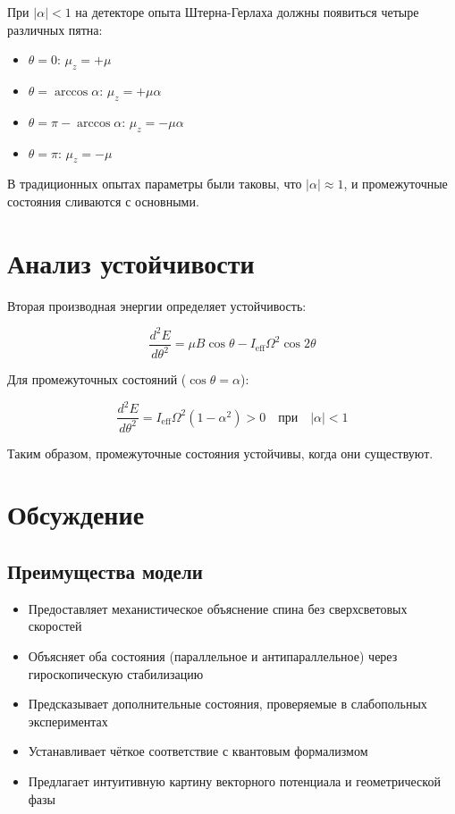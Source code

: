 \documentclass[12pt]{article}
\begin{document}
При $|\alpha| < 1$ на детекторе опыта Штерна-Герлаха должны появиться четыре различных пятна:

\begin{itemize}
\item $\theta = 0$: $\mu_z = +\mu$
\item $\theta = \arccos\alpha$: $\mu_z = +\mu\alpha$
\item $\theta = \pi - \arccos\alpha$: $\mu_z = -\mu\alpha$
\item $\theta = \pi$: $\mu_z = -\mu$
\end{itemize}

В традиционных опытах параметры были таковы, что $|\alpha| \approx 1$, и промежуточные состояния сливаются с основными.

\section{Анализ устойчивости}

Вторая производная энергии определяет устойчивость:

\begin{equation}
\frac{d^2E}{d\theta^2} = \mu B \cos\theta - I_{\text{eff}}\Omega^2 \cos 2\theta
\end{equation}

Для промежуточных состояний ($\cos\theta = \alpha$):

\begin{equation}
\frac{d^2E}{d\theta^2} = I_{\text{eff}}\Omega^2 (1 - \alpha^2) > 0 \quad \text{при} \quad |\alpha| < 1
\end{equation}

Таким образом, промежуточные состояния устойчивы, когда они существуют.

\section{Обсуждение}

\subsection{Преимущества модели}

\begin{itemize}
\item Предоставляет механистическое объяснение спина без сверхсветовых скоростей
\item Объясняет оба состояния (параллельное и антипараллельное) через гироскопическую стабилизацию
\item Предсказывает дополнительные состояния, проверяемые в слабопольных экспериментах
\item Устанавливает чёткое соответствие с квантовым формализмом
\item Предлагает интуитивную картину векторного потенциала и геометрической фазы
\end{itemize}
\end{document}
